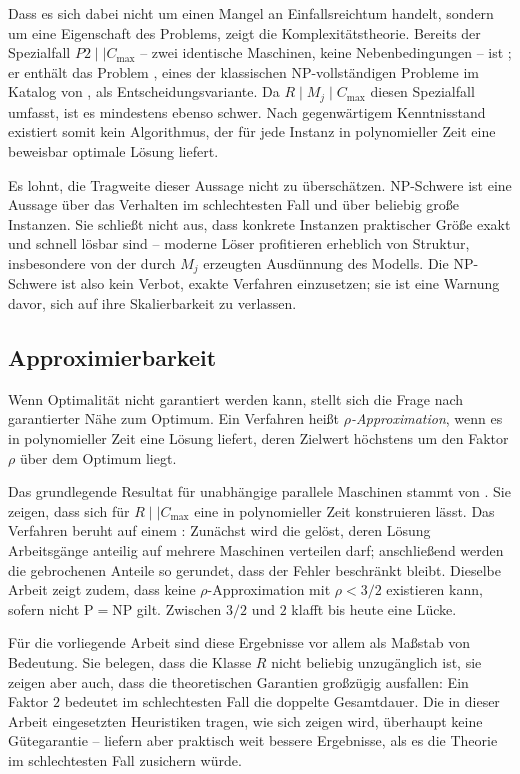 Dass es sich dabei nicht um einen Mangel an Einfallsreichtum handelt, sondern um
eine Eigenschaft des Problems, zeigt die Komplexitätstheorie. Bereits der
Spezialfall $P2 \mid\mid C_{\max}$ -- zwei identische Maschinen, keine
Nebenbedingungen -- ist ; er enthält das Problem
, eines der klassischen NP-vollständigen Probleme im Katalog
von \textcite{garey1979computers}, als Entscheidungsvariante. Da $R \mid M_j \mid
C_{\max}$ diesen Spezialfall umfasst, ist es mindestens ebenso schwer. Nach
gegenwärtigem Kenntnisstand existiert somit kein Algorithmus, der für jede
Instanz in polynomieller Zeit eine beweisbar optimale Lösung liefert.

Es lohnt, die Tragweite dieser Aussage nicht zu überschätzen. NP-Schwere ist
eine Aussage über das Verhalten im schlechtesten Fall und über beliebig große
Instanzen. Sie schließt nicht aus, dass konkrete Instanzen praktischer Größe
exakt und schnell lösbar sind -- moderne Löser profitieren erheblich von
Struktur, insbesondere von der durch $M_j$ erzeugten Ausdünnung des Modells. Die
NP-Schwere ist also kein Verbot, exakte Verfahren einzusetzen; sie ist eine
Warnung davor, sich auf ihre Skalierbarkeit zu verlassen.

\subsection{Approximierbarkeit}

Wenn Optimalität nicht garantiert werden kann, stellt sich die Frage nach
garantierter Nähe zum Optimum. Ein Verfahren heißt
\emph{$\rho$-Approximation}, wenn es in
polynomieller Zeit eine Lösung liefert, deren Zielwert höchstens um den Faktor
$\rho$ über dem Optimum liegt.

Das grundlegende Resultat für unabhängige parallele Maschinen stammt von
\textcite{lenstra1990approximation}. Sie zeigen, dass sich für $R \mid\mid
C_{\max}$ eine  in polynomieller Zeit konstruieren lässt.
Das Verfahren beruht auf einem : Zunächst wird die
 gelöst, deren Lösung Arbeitsgänge anteilig auf mehrere
Maschinen verteilen darf; anschließend werden die gebrochenen Anteile so
gerundet, dass der Fehler beschränkt bleibt. Dieselbe Arbeit zeigt zudem, dass
keine $\rho$-Approximation mit $\rho < 3/2$ existieren kann, sofern nicht
$\mathrm{P} = \mathrm{NP}$ gilt. Zwischen $3/2$ und $2$ klafft bis heute eine
Lücke.

Für die vorliegende Arbeit sind diese Ergebnisse vor allem als Maßstab von
Bedeutung. Sie belegen, dass die Klasse $R$ nicht beliebig unzugänglich ist,
sie zeigen aber auch, dass die theoretischen Garantien großzügig ausfallen: Ein
Faktor $2$ bedeutet im schlechtesten Fall die doppelte Gesamtdauer. Die in
dieser Arbeit eingesetzten Heuristiken tragen, wie sich zeigen wird, überhaupt
keine Gütegarantie -- liefern aber praktisch weit bessere Ergebnisse, als es die
Theorie im schlechtesten Fall zusichern würde.

